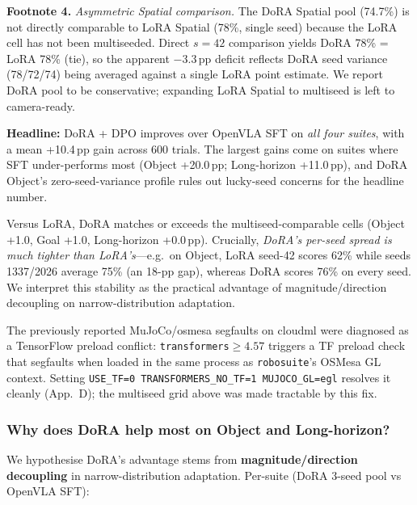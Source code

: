 \documentclass{article}
\begin{document}
\textbf{Footnote 4.} \emph{Asymmetric Spatial comparison.} The DoRA Spatial pool (74.7\%) is not directly comparable to LoRA Spatial (78\%, single seed) because the LoRA cell has not been multiseeded. Direct \(s{=}42\) comparison yields DoRA 78\% = LoRA 78\% (tie), so the apparent \(-3.3\)\,pp deficit reflects DoRA seed variance (78/72/74) being averaged against a single LoRA point estimate. We report DoRA pool to be conservative; expanding LoRA Spatial to multiseed is left to camera-ready.

\textbf{Headline:} DoRA + DPO improves over OpenVLA SFT on \emph{all four suites}, with a mean +10.4\,pp gain across 600 trials. The largest gains come on suites where SFT under-performs most (Object +20.0\,pp; Long-horizon +11.0\,pp), and DoRA Object's zero-seed-variance profile rules out lucky-seed concerns for the headline number.

Versus LoRA, DoRA matches or exceeds the multiseed-comparable cells (Object +1.0, Goal +1.0, Long-horizon +0.0\,pp). Crucially, \emph{DoRA's per-seed spread is much tighter than LoRA's}---e.g.\ on Object, LoRA seed-42 scores 62\% while seeds 1337/2026 average 75\% (an 18-pp gap), whereas DoRA scores 76\% on every seed. We interpret this stability as the practical advantage of magnitude/direction decoupling on narrow-distribution adaptation.

The previously reported MuJoCo/osmesa segfaults on cloudml were diagnosed as a TensorFlow preload conflict: \texttt{transformers}\(\geq 4.57\) triggers a TF preload check that segfaults when loaded in the same process as \texttt{robosuite}'s OSMesa GL context. Setting \texttt{USE\_TF=0 TRANSFORMERS\_NO\_TF=1 MUJOCO\_GL=egl} resolves it cleanly (App.~D); the multiseed grid above was made tractable by this fix.

\subsubsection*{Why does DoRA help most on Object and Long-horizon?}

We hypothesise DoRA's advantage stems from \textbf{magnitude/direction decoupling} in narrow-distribution adaptation. Per-suite (DoRA 3-seed pool vs OpenVLA SFT):
\end{document}
